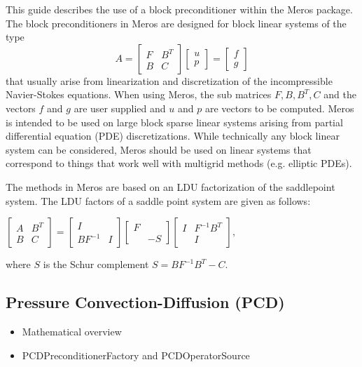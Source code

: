 This guide describes the use of a block preconditioner within the
Meros package.  The block preconditioners in Meros are designed for
block linear systems of the type
$$ A = 
\begin{bmatrix}
F & B^T \\
B & C
\end{bmatrix}
\begin{bmatrix}
u \\
p
\end{bmatrix}
=
\begin{bmatrix}
f \\
g
\end{bmatrix}
$$
that usually arise from linearization and discretization of the
incompressible Navier-Stokes equations. When using Meros, the sub
matrices $F, B, B^T, C$ and the vectors $f$ and $g$ are user supplied
and $u$ and $p$ are vectors to be computed.  Meros is intended to be
used on large block sparse linear systems arising from partial
differential equation (PDE) discretizations.  While technically any
block linear system can be considered, Meros should be used on linear
systems that correspond to things that work well with multigrid
methods (e.g. elliptic PDEs).



The methods in Meros are based on an LDU
factorization of the saddlepoint system. The LDU factors of a saddle
point system are given as follows:

$ \begin{bmatrix} A & B^T \\ B & C \end{bmatrix} = \begin{bmatrix} I &
 \\ BF^{-1} & I \end{bmatrix} \begin{bmatrix} F & \\\ & -S
 \end{bmatrix} \begin{bmatrix} I & F^{-1} B^T \\ & I \end{bmatrix}, $

where $S$ is the Schur complement $S = B F^{-1} B^T - C$.

\subsection{Pressure Convection-Diffusion (PCD)}
\begin{itemize}
\item Mathematical overview
\item PCDPreconditionerFactory and PCDOperatorSource
\end{itemize}


